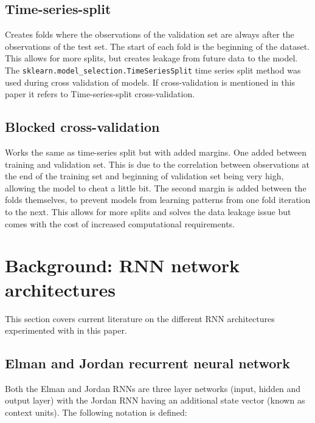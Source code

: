 \documentclass[conference]{IEEEtran}
\begin{document}
\subsection{Time-series-split}

Creates folds where the observations of the validation set are always after the observations of the test set. The start of each fold is the beginning of the dataset. This allows for more splits, but creates leakage from future data to the model. The \texttt{sklearn.model\_selection.TimeSeriesSplit} time series split method was used during cross validation of models. If cross-validation is mentioned in this paper it refers to Time-series-split cross-validation.

\subsection{Blocked cross-validation}

Works the same as time-series split but with added margins. One added between training and validation set. This is due to the correlation between observations at the end of the training set and beginning of validation set being very high, allowing the model to cheat a little bit. The second margin is added between the folds themselves, to prevent models from learning patterns from one fold iteration to the next. This allows for more splits and solves the data leakage issue but comes with the cost of increased computational requirements.

\section{Background: RNN network architectures}

This section covers current literature on the different RNN architectures experimented with in this paper.

\subsection{Elman and Jordan recurrent neural network}

Both the Elman and Jordan RNNs are three layer networks (input, hidden and output layer) with the Jordan RNN having an additional state vector (known as context units). The following notation is defined:
\end{document}
